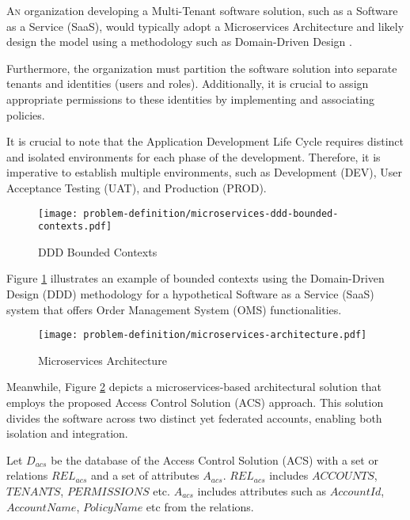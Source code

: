 \lettrine{A}{n} organization developing a Multi-Tenant software solution, such as a Software as a Service (SaaS), would typically adopt a Microservices Architecture \cite{c2} and likely design the model using a methodology such as Domain-Driven Design \cite{c3}.

Furthermore, the organization must partition the software solution into separate tenants and identities (users and roles). Additionally, it is crucial to assign appropriate permissions to these identities by implementing and associating policies.

It is crucial to note that the Application Development Life Cycle requires distinct and isolated environments for each phase of the development. Therefore, it is imperative to establish multiple environments, such as Development (DEV), User Acceptance Testing (UAT), and Production (PROD).

\begin{figure}[htbp]
    \centering
    \texttt{[image: problem-definition/microservices-ddd-bounded-contexts.pdf]}
    \caption{DDD Bounded Contexts}
    \label{fig:microservices-ddd-bounded-contexts}
\end{figure}

Figure \ref{fig:microservices-ddd-bounded-contexts} illustrates an example of bounded contexts using the Domain-Driven Design (DDD) methodology for a hypothetical Software as a Service (SaaS) system that offers Order Management System (OMS) functionalities.

\begin{figure}[htbp]
    \centering
    \texttt{[image: problem-definition/microservices-architecture.pdf]}
    \caption{Microservices Architecture}
    \label{fig:microservices-architecture}
\end{figure}

Meanwhile, Figure \ref{fig:microservices-architecture} depicts a microservices-based architectural solution that employs the proposed Access Control Solution (ACS) approach. This solution divides the software across two distinct yet federated accounts, enabling both isolation and integration.

\vspace{15pt}

Let $D_{acs}$ be the database of the Access Control Solution (ACS) with a set or relations $REL_{acs}$ and a set of attributes $A_{acs}$.
$REL_{acs}$ includes $ACCOUNTS$, $TENANTS$, $PERMISSIONS$ etc.
$A_{acs}$ includes attributes such as $AccountId$, $AccountName$, $PolicyName$ etc from the relations.

